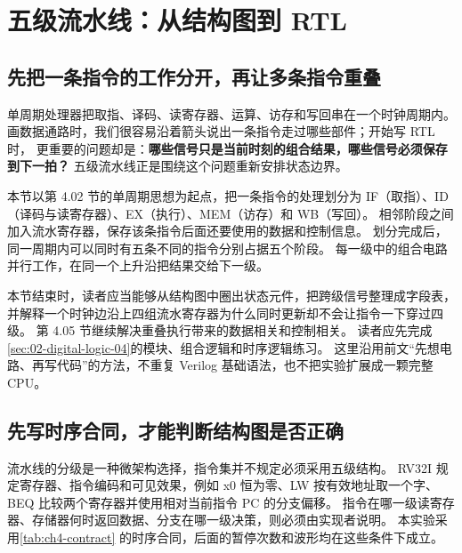 \section{五级流水线：从结构图到 RTL}
\label{sec:04-processor-core-04}

\subsection{先把一条指令的工作分开，再让多条指令重叠}

单周期处理器把取指、译码、读寄存器、运算、访存和写回串在一个时钟周期内。
画数据通路时，我们很容易沿着箭头说出一条指令走过哪些部件；开始写 RTL 时，
更重要的问题却是：\textbf{哪些信号只是当前时刻的组合结果，哪些信号必须保存到下一拍？}
五级流水线正是围绕这个问题重新安排状态边界。

本节以第 4.02 节的单周期思想为起点，把一条指令的处理划分为
IF（取指）、ID（译码与读寄存器）、EX（执行）、MEM（访存）和 WB（写回）。
相邻阶段之间加入流水寄存器，保存该条指令后面还要使用的数据和控制信息。
划分完成后，同一周期内可以同时有五条不同的指令分别占据五个阶段。
每一级中的组合电路并行工作，在同一个上升沿把结果交给下一级。

本节结束时，读者应当能够从结构图中圈出状态元件，把跨级信号整理成字段表，
并解释一个时钟边沿上四组流水寄存器为什么同时更新却不会让指令一下穿过四级。
第 4.05 节继续解决重叠执行带来的数据相关和控制相关。
读者应先完成\cref{sec:02-digital-logic-04}的模块、组合逻辑和时序逻辑练习。
这里沿用前文“先想电路、再写代码”的方法，不重复 Verilog 基础语法，也不把实验扩展成一颗完整 CPU。


\subsection{先写时序合同，才能判断结构图是否正确}

流水线的分级是一种微架构选择，指令集并不规定必须采用五级结构。
RV32I 规定寄存器、指令编码和可见效果，例如 x0 恒为零、LW 按有效地址取一个字、
BEQ 比较两个寄存器并使用相对当前指令 PC 的分支偏移\cite{ch4-rv32i}。
指令在哪一级读寄存器、存储器何时返回数据、分支在哪一级决策，则必须由实现者说明。
本实验采用\cref{tab:ch4-contract} 的时序合同，后面的暂停次数和波形均在这些条件下成立。


